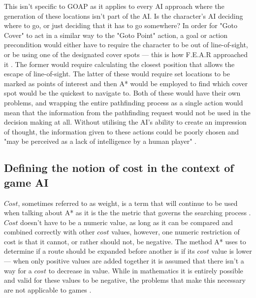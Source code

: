 \documentclass[11pt, a4paper]{report}
\begin{document}
This isn't specific to GOAP as it applies to every AI approach where the generation of these locations isn't part of the AI. Is the character's AI deciding where to go, or just deciding that it has to go somewhere? In order for "Goto Cover" to act in a similar way to the "Goto Point" action, a goal or action precondition would either have to require the character to be out of line-of-sight, or be using one of the designated cover spots --- this is how F.E.A.R \parencite*{FEAR} approached it \parencite[12]{orkin2006three}. The former would require calculating the closest position that allows the escape of line-of-sight. The latter of these would require set locations to be marked as points of interest and then A* would be employed to find which cover spot would be the quickest to navigate to. Both of these would have their own problems, and wrapping the entire pathfinding process as a single action would mean that the information from the pathfinding request would not be used in the decision making at all. Without utilising the AI's ability to create an impression of thought, the information given to these actions could be poorly chosen and "may be perceived as a lack of intelligence by a human player" \parencite[63]{graham2003pathfinding}.

\subsection{Defining the notion of cost in the context of game AI}
\label{subsec:definingTheNotionOfCost}

$Cost$, sometimes referred to as weight, is a term that will continue to be used when talking about A* as it is the the metric that governs the searching process \parencite[60]{graham2003pathfinding}. $Cost$ doesn't have to be a numeric value, as long as it can be compared and combined correctly with other $cost$ values, however, one numeric restriction of cost is that it cannot, or rather should not, be negative. The method A* uses to determine if a route should be expanded before another is if its $cost$ value is lower --- when only positive values are added together it is assumed that there isn't a way for a $cost$ to decrease in value. While in mathematics it is entirely possible and valid for these values to be negative, the problems that make this necessary are not applicable to games \parencite[202]{millington2019ai}.
\end{document}
